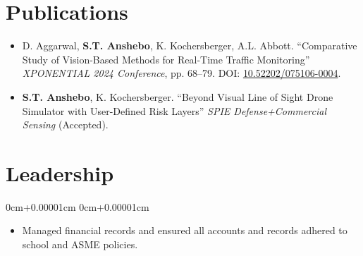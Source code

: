 \documentclass[10pt, letterpaper]{article}
\newenvironment{highlightsforbulletentries}{
    \begin{itemize}[
        topsep=0.05cm,
        parsep=0.05cm,
        partopsep=0pt,
        itemsep=0pt,
        leftmargin=10pt
    ]
}{
    \end{itemize}
}
\newenvironment{onecolentry}{
    \begin{adjustwidth}{
        0cm+0.00001cm
    }{
        0cm+0.00001cm
    }
}{
    \end{adjustwidth}
}
\begin{document}
\section{Publications}
\begin{itemize}[leftmargin=*, label={$\bullet$}]
    \item D. Aggarwal, \textbf{S.T. Anshebo}, K. Kochersberger, A.L. Abbott.   ``Comparative Study of Vision-Based Methods for Real-Time Traffic Monitoring'' 
    \textit{XPONENTIAL 2024 Conference}, pp. 68--79. DOI: 
    \href{https://doi.org/10.52202/075106-0004}{10.52202/075106-0004}.
    
    \item \textbf{S.T. Anshebo}, K. Kochersberger. 
    ``Beyond Visual Line of Sight Drone Simulator with User-Defined Risk Layers'' 
    \textit{SPIE Defense+Commercial Sensing} (Accepted).
\end{itemize}

\section{Leadership}
\begin{onecolentry}
    \begin{highlightsforbulletentries}
        \item Managed financial records and ensured all accounts and records adhered to school and ASME policies.
    \end{highlightsforbulletentries}
\end{onecolentry}
\end{document}

